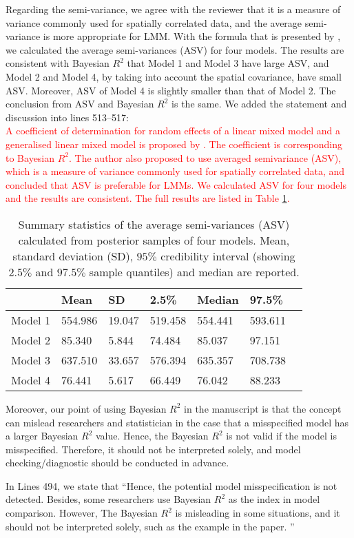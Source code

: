 \documentclass[a4paper]{article}   	%
\begin{document}
\begin{enumerate}
    Regarding the semi-variance, we agree with the reviewer that it is a measure of variance commonly used for spatially correlated data, and the average semi-variance is more appropriate for LMM. With the formula that is presented by \textcite{Piepho2019Coefficient}, we calculated the average semi-variances (ASV) for four models. The results are consistent with Bayesian $R^2$ that Model 1 and Model 3 have large ASV, and Model 2 and Model 4, by taking into account the spatial covariance, have small ASV. Moreover, ASV of Model 4 is slightly smaller than that of Model 2. The conclusion from ASV and Bayesian $R^2$ is the same. We added the statement and discussion into lines 513--517:\\
    \textcolor{red}{A coefficient of determination for random effects of a linear mixed model and a generalised linear mixed model is proposed by \textcite{Piepho2019Coefficient}. The coefficient is corresponding to Bayesian $R^2$. The author also proposed to use averaged semivariance (ASV), which is a measure of variance commonly used for spatially correlated data, and concluded that ASV is preferable for LMMs. We calculated ASV for four models and the results are consistent. The full results are listed in Table \ref{tb:asv}. }
    
    \begin{table}[!htp]
    \centering
    \begin{tabular}{lllllll}
    \toprule
            & Mean     & SD     & 2.5\%   & Median  & 97.5\% \\ \midrule
    Model 1 & 554.986  & 19.047 &519.458  & 554.441 & 593.611   \\
    Model 2 & 85.340   & 5.844  & 74.484  & 85.037  & 97.151     \\
    Model 3 & 637.510  & 33.657 & 576.394 & 635.357 & 708.738  \\
    Model 4 & 76.441   & 5.617  & 66.449  & 76.042  & 88.233\\
    \bottomrule
    \end{tabular}\caption{Summary statistics of the average semi-variances (ASV) calculated from posterior samples of four models. Mean, standard deviation (SD), $95\%$ credibility interval (showing $2.5\%$ and $97.5\%$ sample quantiles) and median are reported.}\label{tb:asv}
    \end{table}
    
    Moreover, our point of using Bayesian $R^2$ in the manuscript is that the concept can mislead researchers and statistician in the case that a misspecified model has a larger Bayesian $R^2$ value. Hence, the Bayesian $R^2$ is not valid if the model is misspecified. Therefore, it should not be interpreted solely, and model checking/diagnostic should be conducted in advance. 
    
    In Lines 494, we state that ``Hence, the potential model misspecification is not detected. Besides, some researchers use Bayesian $R^2$ as the index in model comparison. However, The Bayesian $R^2$ is misleading in some  situations, and it should not be interpreted solely, such as the example in the paper. ''
    
\end{enumerate}




\renewcommand\bibname{References}%
\printbibliography
\end{document}
